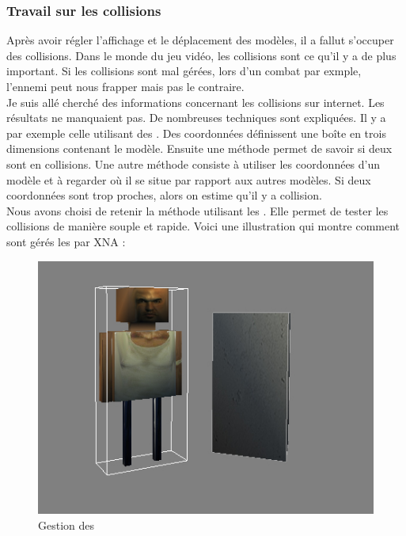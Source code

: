 \documentclass{article}
\begin{document}
\subsubsection{Travail sur les collisions}
Après avoir régler l'affichage et le déplacement des modèles, il a fallut s'occuper des collisions. Dans le monde du jeu vidéo, les collisions sont ce qu'il y a de plus important. Si les collisions sont mal gérées, lors d'un combat par exmple, l'ennemi peut nous frapper mais pas le contraire. \\
Je suis allé cherché des informations concernant les collisions sur internet. Les résultats ne manquaient pas. De nombreuses techniques sont expliquées. Il y a par exemple celle utilisant des . Des coordonnées définissent une boîte en trois dimensions contenant le modèle. Ensuite une méthode permet de savoir si deux  sont en collisions. Une autre méthode consiste à utiliser les coordonnées d'un modèle et à regarder où il se situe par rapport aux autres modèles. Si deux coordonnées sont trop proches, alors on estime qu'il y a collision.\\
Nous avons choisi de retenir la méthode utilisant les . Elle permet de tester les collisions de manière souple et rapide. Voici une illustration qui montre comment sont gérés les  par XNA : 

\begin{figure}[h]
\begin{center}
\includegraphics[scale=0.7]{BoundingBox.jpg}
\caption{Gestion des }
\end{center}
\end{figure}
\end{document}
